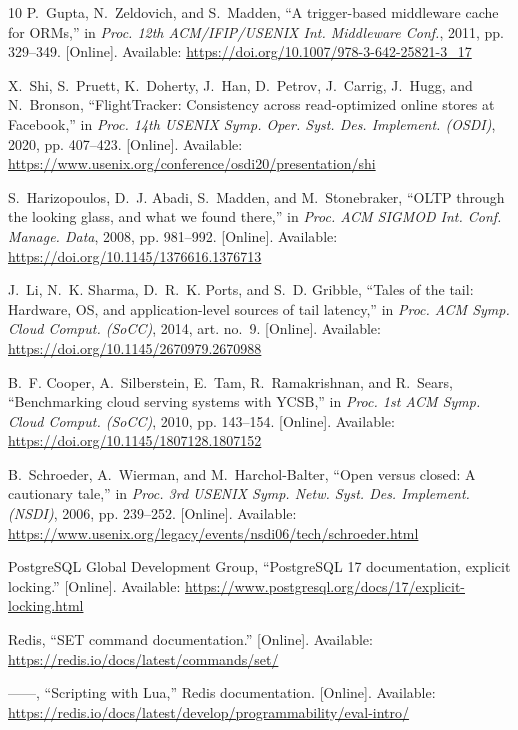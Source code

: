 \documentclass[conference]{IEEEtran}
\begin{document}
\begin{thebibliography}{10}
P.~Gupta, N.~Zeldovich, and S.~Madden, ``A trigger-based middleware cache for
  {ORMs},'' in \emph{Proc. 12th ACM/IFIP/USENIX Int. Middleware Conf.}, 2011,
  pp. 329--349. [Online]. Available:
  \url{https://doi.org/10.1007/978-3-642-25821-3_17}

X.~Shi, S.~Pruett, K.~Doherty, J.~Han, D.~Petrov, J.~Carrig, J.~Hugg, and
  N.~Bronson, ``{FlightTracker}: Consistency across read-optimized online
  stores at {Facebook},'' in \emph{Proc. 14th USENIX Symp. Oper. Syst. Des.
  Implement. (OSDI)}, 2020, pp. 407--423. [Online]. Available:
  \url{https://www.usenix.org/conference/osdi20/presentation/shi}

S.~Harizopoulos, D.~J. Abadi, S.~Madden, and M.~Stonebraker, ``{OLTP} through
  the looking glass, and what we found there,'' in \emph{Proc. ACM SIGMOD Int.
  Conf. Manage. Data}, 2008, pp. 981--992. [Online]. Available:
  \url{https://doi.org/10.1145/1376616.1376713}

J.~Li, N.~K. Sharma, D.~R.~K. Ports, and S.~D. Gribble, ``Tales of the tail:
  Hardware, {OS}, and application-level sources of tail latency,'' in
  \emph{Proc. ACM Symp. Cloud Comput. (SoCC)}, 2014, art. no.~9. [Online].
  Available: \url{https://doi.org/10.1145/2670979.2670988}

B.~F. Cooper, A.~Silberstein, E.~Tam, R.~Ramakrishnan, and R.~Sears,
  ``Benchmarking cloud serving systems with {YCSB},'' in \emph{Proc. 1st ACM
  Symp. Cloud Comput. (SoCC)}, 2010, pp. 143--154. [Online]. Available:
  \url{https://doi.org/10.1145/1807128.1807152}

B.~Schroeder, A.~Wierman, and M.~Harchol-Balter, ``Open versus closed: A
  cautionary tale,'' in \emph{Proc. 3rd USENIX Symp. Netw. Syst. Des.
  Implement. (NSDI)}, 2006, pp. 239--252. [Online]. Available:
  \url{https://www.usenix.org/legacy/events/nsdi06/tech/schroeder.html}

{PostgreSQL Global Development Group}, ``{PostgreSQL} 17 documentation,
  explicit locking.'' [Online]. Available:
  \url{https://www.postgresql.org/docs/17/explicit-locking.html}

{Redis}, ``{SET} command documentation.'' [Online]. Available:
  \url{https://redis.io/docs/latest/commands/set/}

------, ``Scripting with {Lua},'' Redis documentation. [Online]. Available:
  \url{https://redis.io/docs/latest/develop/programmability/eval-intro/}


\end{thebibliography}
\end{document}
